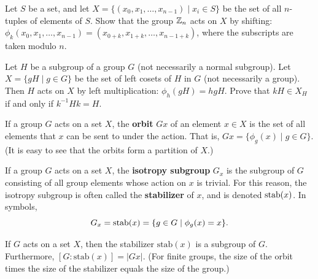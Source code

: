 \begin{problem}\label{prob:shiftaction}
Let $S$ be a set, and let $X = \{(x_0, x_1, \ldots, x_{n-1}) \mid x_i \in S \}$ be the set of all $n$-tuples of elements of $S$. Show that the group $\mathbb{Z}_n$ acts on $X$ by shifting: $\phi_k(x_0,x_1,\ldots,x_{n-1}) = (x_{0+k}, x_{1+k}, \ldots, x_{n-1+k})$, where the subscripts are taken modulo $n$.
\end{problem}

\begin{problem}\label{prob:leftcosetact}
Let $H$ be a subgroup of a group $G$ (not necessarily a normal subgroup).  Let $X = \{gH \mid g\in G\}$ be the set of left cosets of $H$ in $G$ (not necessarily a group).  Then $H$ acts on $X$ by left multiplication: $\phi_h(gH) = hgH$.  Prove that $kH \in X_H$ if and only if $k^{-1}Hk = H$.
\end{problem}

\begin{definition}
 If a group $G$ acts on a set $X$, the \textbf{orbit} $Gx$ of an element $x \in X$ is the set of all elements that $x$ can be sent to under the action.  That is, $Gx = \{ \phi_g(x) \mid g \in G \}$.  (It is easy to see that the orbits form a partition of $X$.)
\end{definition}

\begin{definition}
 If a group $G$ acts on a set $X$, the \textbf{isotropy subgroup} $G_x$ is the subgroup of $G$ consisting of all group elements whose action on $x$ is trivial.  For this reason, the isotropy subgroup is often called the \textbf{stabilizer} of $x$, and is denoted $\operatorname{stab}(x)$.  In symbols,
 $$G_x = \operatorname{stab}(x) = \{ g \in G \mid \phi_g(x) = x \}.$$
\end{definition}

\begin{theorem}\label{thm:orbitstab}
 If $G$ acts on a set $X$, then the stabilizer $\mbox{stab}(x)$ is a subgroup of $G$. Furthermore, $[G:\mbox{stab}(x)] = \lvert Gx \rvert$. (For finite groups, the size of the orbit times the size of the stabilizer equals the size of the group.)
\begin{annotation}
\end{annotation}
\end{theorem}

